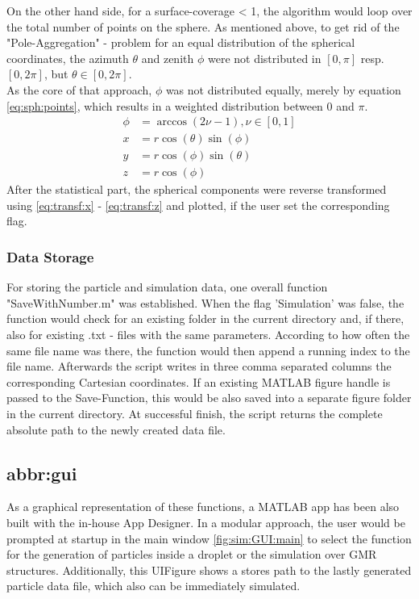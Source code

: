 On the other hand side, for a surface-coverage < 1, the algorithm would loop over the total number of points on the sphere. As mentioned above, to get rid of the "Pole-Aggregation" - problem for an equal distribution of the spherical coordinates, the azimuth $\theta$ and zenith $\phi$ were not distributed in $[0,\pi]$ resp. $[0,2\pi]$, but $\theta \in [0,2\pi]$.\\ As the core of that approach, $\phi$ was not distributed equally, merely by equation \ref{eq:sph:points}, which results in a weighted distribution between 0 and $\pi$.
\begin{align}
\phi & = \arccos(2\nu - 1), \nu\in[0,1] \label{eq:sph:points}\\
x &= r\cos(\theta)\sin(\phi) \label{eq:transf:x}\\
y &= r\cos(\phi)\sin(\theta) \label{eq:transf:y}\\
z &= r\cos(\phi) \label{eq:transf:z}
\end{align}
After the statistical part, the spherical components were reverse transformed using \ref{eq:transf:x} - \ref{eq:transf:z} and plotted, if the user set the corresponding flag.\cite{lit:sim:sphere_point_picking}
\subsubsection{Data Storage}
For storing the particle and simulation data, one overall function "SaveWithNumber.m" was established. When the flag 'Simulation' was false, the function would check for an existing folder in the current directory and, if there, also for existing .txt - files with the same parameters. According to how often the same file name was there, the function would then append a running index to the file name. Afterwards the script writes in three comma separated columns the corresponding Cartesian coordinates. If an existing MATLAB figure handle is passed to the Save-Function, this would be also saved into a separate figure folder in the current directory. At successful finish, the script returns the complete absolute path to the newly created data file. 
\clearpage
\newpage
\subsection{\acrfull{abbr:gui}}
As a graphical representation of these functions, a  MATLAB app has been also built with the in-house App Designer. In a modular approach, the user would be prompted at startup in the main window \ref{fig:sim:GUI:main} to select the function for the generation of particles inside a droplet or the simulation over GMR structures. Additionally, this UIFigure shows a stores path to the lastly generated particle data file, which also can be immediately simulated.


